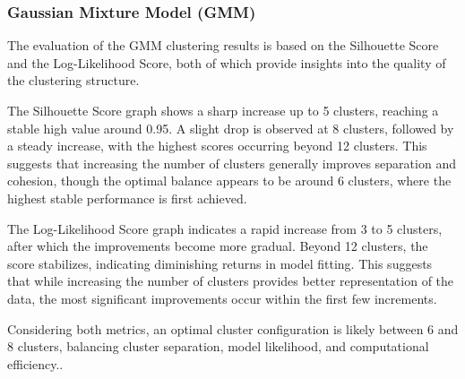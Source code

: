        \subsubsection{Gaussian Mixture Model (GMM) \\}

            The evaluation of the GMM clustering results is based on the Silhouette Score and the Log-Likelihood Score, both of which provide insights into the quality of the clustering structure.

            The Silhouette Score graph shows a sharp increase up to 5 clusters, reaching a stable high value around 0.95. A slight drop is observed at 8 clusters, followed by a steady increase, with the highest scores occurring beyond 12 clusters. This suggests that increasing the number of clusters generally improves separation and cohesion, though the optimal balance appears to be around 6 clusters, where the highest stable performance is first achieved.

            The Log-Likelihood Score graph indicates a rapid increase from 3 to 5 clusters, after which the improvements become more gradual. Beyond 12 clusters, the score stabilizes, indicating diminishing returns in model fitting. This suggests that while increasing the number of clusters provides better representation of the data, the most significant improvements occur within the first few increments.

            Considering both metrics, an optimal cluster configuration is likely between 6 and 8 clusters, balancing cluster separation, model likelihood, and computational efficiency..

        
